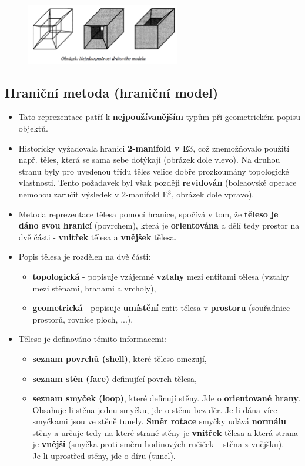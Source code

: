 \begin{figure}[H]
	\centering
	\includegraphics[width=0.6\textwidth]{assets/4_dratovy_model}
\end{figure} 

 \subsection{Hraniční metoda (hraniční model)}
 \begin{itemize}
 	\item Tato reprezentace patří k \textbf{nejpoužívanějším} typům při geometrickém popisu objektů.
 	\item Historicky vyžadovala hranici \textbf{2-manifold v E$3$}, což znemožňovalo použití např. těles, která se sama sebe dotýkají (obrázek dole vlevo). Na druhou stranu byly pro uvedenou třídu těles velice dobře prozkoumány topologické vlastnosti. Tento požadavek byl však později \textbf{revidován} (boleaovské operace nemohou zaručit výsledek v 2-manifold E$^3$, obrázek dole vpravo).
 	\item Metoda reprezentace tělesa pomocí hranice, spočívá v tom, že \textbf{těleso je dáno svou hranicí} (povrchem), která je \textbf{orientována} a dělí tedy prostor na dvě části - \textbf{vnitřek} tělesa a \textbf{vnějšek} tělesa.
 	\item Popis tělesa je rozdělen na dvě části:
 	\begin{itemize}
		\item \textbf{topologická} - popisuje vzájemné \textbf{vztahy} mezi entitami tělesa (vztahy mezi stěnami, hranami a vrcholy),
		\item \textbf{geometrická} - popisuje \textbf{umístění} entit tělesa v \textbf{prostoru} (souřadnice prostorů, rovnice ploch, ...).
 	\end{itemize}
 	\item Těleso je definováno těmito informacemi:
 	\begin{itemize}
		\item	\textbf{seznam povrchů (shell)}, které těleso omezují,
		\item	\textbf{seznam stěn (face)} definující povrch tělesa,
		\item	\textbf{seznam smyček (loop)}, které definují stěny. Jde o \textbf{orientované hrany}. Obsahuje-li stěna jednu smyčku, jde o stěnu bez děr. Je li dána více smyčkami jsou ve stěně tunely. \textbf{Směr rotace} smyčky udává \textbf{normálu} stěny a určuje tedy na které straně stěny je \textbf{vnitřek} tělesa a která strana je \textbf{vnější} (smyčka proti směru hodinových ručiček – stěna z vnějšku). Je‑li uprostřed stěny, jde o díru (tunel).

\end{itemize}
\end{itemize}
